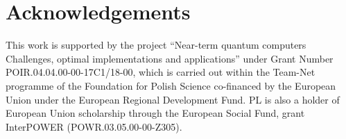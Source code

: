 \documentclass[preprint,12pt, a4paper, dvipsnames]{elsarticle}
\newcommand{\1}{{\rm 1\hspace{-0.9mm}l}}
\theoremstyle{definition}
\begin{document}
\section*{Acknowledgements}

This work is supported by the project “Near-term quantum computers Challenges, optimal
implementations and applications” under Grant Number POIR.04.04.00-00-17C1/18-00, which is carried
out within the Team-Net programme of the Foundation for Polish Science co-financed by the European
Union under the European Regional Development Fund. PL is also a holder of European Union
scholarship through the European Social Fund, grant InterPOWER (POWR.03.05.00-00-Z305).



\end{document}
